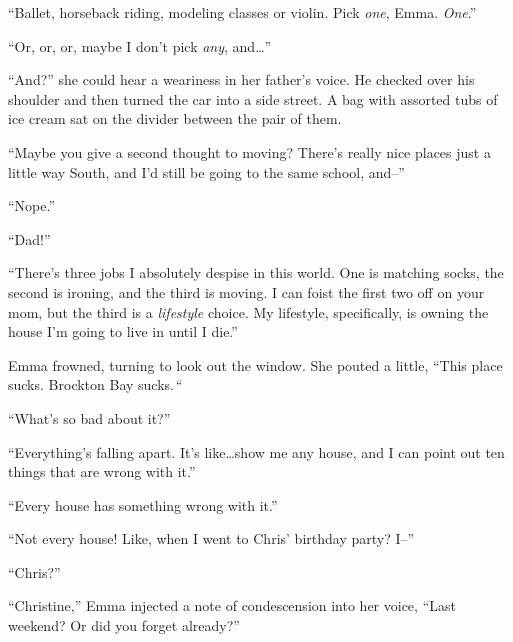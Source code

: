 





``Ballet, horseback riding, modeling classes or violin.  Pick \emph{one}, Emma.  \emph{One}.''



``Or, or, or, maybe I don't pick \emph{any}, and\ldots''



``And?'' she could hear a weariness in her father's voice.  He checked over his shoulder and then turned the car into a side street.  A bag with assorted tubs of ice cream sat on the divider between the pair of them.



``Maybe you give a second thought to moving?   There's really nice places just a little way South, and I'd still be going to the same school, and--''



``Nope.''



``Dad!''



``There's three jobs I absolutely despise in this world.  One is matching socks, the second is ironing, and the third is moving.  I can foist the first two off on your mom, but the third is a \emph{lifestyle} choice.  My lifestyle, specifically, is owning the house I'm going to live in until I die.''



Emma frowned, turning to look out the window.  She pouted a little, ``This place sucks.  Brockton Bay sucks.\emph{``}



``What's so bad about it?''



``Everything's falling apart.  It's like\ldots show me any house, and I can point out ten things that are wrong with it.''



``Every house has something wrong with it.''



``Not every house!  Like, when I went to Chris' birthday party?  I--''



``Chris?''



``Christine,'' Emma injected a note of condescension into her voice, ``Last weekend?  Or did you forget already?''



